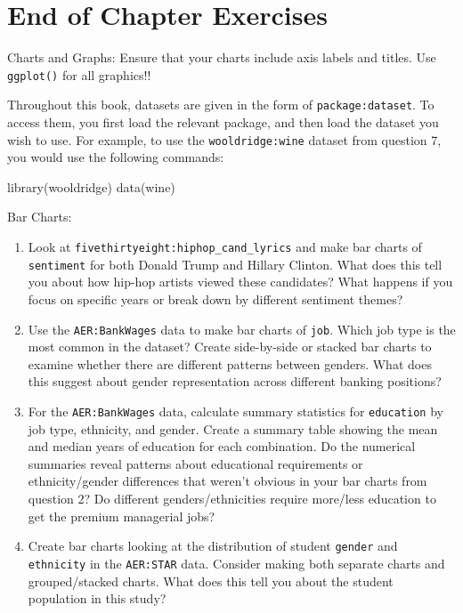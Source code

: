 \documentclass[
  letterpaper,
]{book}
\newenvironment{Shaded}{\begin{snugshade}}{\end{snugshade}}
\newcommand{\FunctionTok}[1]{\textcolor[rgb]{0.28,0.35,0.67}{#1}}
\newcommand{\NormalTok}[1]{\textcolor[rgb]{0.00,0.23,0.31}{#1}}
\begin{document}
\section{End of Chapter Exercises}\label{end-of-chapter-exercises-1}

Charts and Graphs: Ensure that your charts include axis labels and
titles. Use \texttt{ggplot()} for all graphics!!

Throughout this book, datasets are given in the form of
\texttt{package:dataset}. To access them, you first load the relevant
package, and then load the dataset you wish to use. For example, to use
the \texttt{wooldridge:wine} dataset from question 7, you would use the
following commands:

\begin{Shaded}
\begin{Highlighting}[]
\FunctionTok{library}\NormalTok{(wooldridge)}
\FunctionTok{data}\NormalTok{(wine)}
\end{Highlighting}
\end{Shaded}

Bar Charts:

\begin{enumerate}
\def\labelenumi{\arabic{enumi}.}
\item
  Look at \texttt{fivethirtyeight:hiphop\_cand\_lyrics} and make bar
  charts of \texttt{sentiment} for both Donald Trump and Hillary
  Clinton. What does this tell you about how hip-hop artists viewed
  these candidates? What happens if you focus on specific years or break
  down by different sentiment themes?
\item
  Use the \texttt{AER:BankWages} data to make bar charts of
  \texttt{job}. Which job type is the most common in the dataset? Create
  side-by-side or stacked bar charts to examine whether there are
  different patterns between genders. What does this suggest about
  gender representation across different banking positions?
\item
  For the \texttt{AER:BankWages} data, calculate summary statistics for
  \texttt{education} by job type, ethnicity, and gender. Create a
  summary table showing the mean and median years of education for each
  combination. Do the numerical summaries reveal patterns about
  educational requirements or ethnicity/gender differences that weren't
  obvious in your bar charts from question 2? Do different
  genders/ethnicities require more/less education to get the premium
  managerial jobs?
\item
  Create bar charts looking at the distribution of student
  \texttt{gender} and \texttt{ethnicity} in the \texttt{AER:STAR} data.
  Consider making both separate charts and grouped/stacked charts. What
  does this tell you about the student population in this study?
\end{enumerate}
\end{document}
